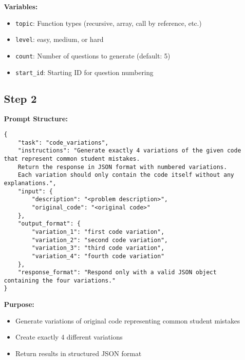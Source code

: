 {\begin{tcolorbox}[
    colback=white,
    colframe=blue!75!black,
    title=C++ Question Generation Prompt,
    fonttitle=\bfseries
]
\textbf{Variables:}
\begin{itemize}
    \item \texttt{topic}: Function types (recursive, array, call by reference, etc.)
    \item \texttt{level}: easy, medium, or hard
    \item \texttt{count}: Number of questions to generate (default: 5)
    \item \texttt{start\_id}: Starting ID for question numbering
\end{itemize}
\end{tcolorbox}



\subsection*{Step 2}





\begin{tcolorbox}[
    colback=white,
    colframe=blue!75!black,
    title=Code Variations Generation Prompt,
    fonttitle=\bfseries
]
\textbf{Prompt Structure:}

\begin{lstlisting}[style=jsonStyle]
{
    "task": "code_variations",
    "instructions": "Generate exactly 4 variations of the given code that represent common student mistakes. 
    Return the response in JSON format with numbered variations.
    Each variation should only contain the code itself without any explanations.",
    "input": {
        "description": "<problem description>",
        "original_code": "<original code>"
    },
    "output_format": {
        "variation_1": "first code variation",
        "variation_2": "second code variation",
        "variation_3": "third code variation",
        "variation_4": "fourth code variation"
    },
    "response_format": "Respond only with a valid JSON object containing the four variations."
}
\end{lstlisting}

\textbf{Purpose:}
\begin{itemize}
    \item Generate variations of original code representing common student mistakes
    \item Create exactly 4 different variations
    \item Return results in structured JSON format
\end{itemize}


\end{tcolorbox}}
